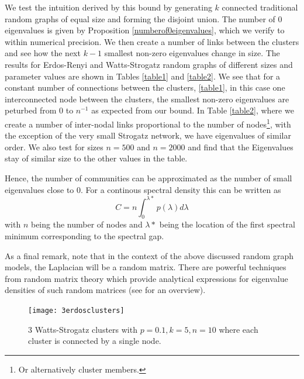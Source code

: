 \documentclass{article}
\begin{document}
We test the intuition derived by this bound by generating $k$ connected traditional random graphs of equal size and forming the disjoint union.  The number of $0$ eigenvalues is given by Proposition \ref{numberof0eigenvalues}, which we verify to within numerical precision. We then create a number of links between the clusters and see how the next $k-1$ smallest non-zero eigenvalues change in size. The results for Erdos-Renyi \citep{erdos1959random} and Watts-Strogatz \citep{watts1998collective} random graphs of different sizes and parameter values are shown in Tables \ref{table1} and \ref{table2}. We see that for a constant number of connections between the clusters, \ref{table1}, in this case one interconnected node between the clusters, the smallest non-zero eigenvalues are peturbed from $0$ to $n^{-1}$ as expected from our bound. In Table \ref{table2}, where we create a number of inter-nodal links proportional to the number of nodes\footnote{Or alternatively cluster members.}, with the exception of the very small Strogatz network, we have eigenvalues of similar order. We also test for sizes $n=500$ and $n=2000$ and find that the Eigenvalues stay of similar size to the other values in the table.


Hence, the number of communities can be approximated as the number of small eigenvalues close to 0. For a continous spectral density this can be written as 
\begin{equation}
C = n\int_{0}^{\lambda*} p(\lambda)d\lambda
\end{equation}
with $n$ being the number of nodes and $\lambda*$ being the location of the first spectral minimum corresponding to the spectral gap. 

As a final remark, note that in the context of the above discussed random graph models, the Laplacian will be a random matrix. There are powerful techniques from random matrix theory which provide analytical expressions for eigenvalue densities of such random matrices (see \cite{RMTbook} for an overview). 


\begin{figure}[t]
	\centering
	\texttt{[image: 3erdosclusters]}
	\caption{3 Watts-Strogatz clusters with $p=0.1,k=5,n=10$ where each cluster is connected by a single node. }
	\label{fig:sub3}	
\end{figure}
\end{document}
